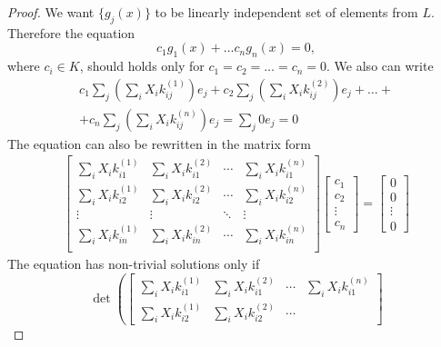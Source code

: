 \begin{theorem}
\begin{proof}
{      We want $\{g_j(x)\}$ to be linearly independent set of elements
      from $L$. Therefore the equation
      \[
      c_1 g_1(x) + \dots c_n g_n(x) = 0,
      \]
      where $c_i \in K$, should holds only for $c_1 = c_2 = \dots =
      c_n = 0$.
      We also can write
      \begin{eqnarray}
      c_1 \sum_j \left(\sum_i X_i k_{ij}^{(1)} \right) e_j  +
      c_2 \sum_j \left(\sum_i X_i k_{ij}^{(2)} \right) e_j  +
      \dots
      +
      \nonumber \\
      +
      c_n \sum_j \left(\sum_i X_i k_{ij}^{(n)} \right) e_j  =
      \sum_j 0 e_j = 0
      \nonumber
      \end{eqnarray}
      The equation can also be rewritten in the matrix form
      \begin{eqnarray}
        \begin{bmatrix}
          \sum_i X_i k_{i1}^{(1)} & \sum_i X_i k_{i1}^{(2)} & \cdots &
          \sum_i X_i k_{i1}^{(n)} \\
          \sum_i X_i k_{i2}^{(1)} & \sum_i X_i k_{i2}^{(2)} & \cdots &
          \sum_i X_i k_{i2}^{(n)} \\
          \vdots & \vdots & \ddots & \vdots \\
          \sum_i X_i k_{in}^{(1)} & \sum_i X_i k_{in}^{(2)} & \cdots &
          \sum_i X_i k_{in}^{(n)} \\
        \end{bmatrix}
        \begin{bmatrix}
          c_1 \\
          c_2 \\
          \vdots \\
          c_n
        \end{bmatrix}
        =      
        \begin{bmatrix}
          0 \\
          0 \\
          \vdots \\
          0
        \end{bmatrix}
        \nonumber
      \end{eqnarray}
      The equation has non-trivial solutions only if
      \begin{equation}
      \det\left(
        \begin{bmatrix}
          \sum_i X_i k_{i1}^{(1)} & \sum_i X_i k_{i1}^{(2)} & \cdots &
          \sum_i X_i k_{i1}^{(n)} \\
          \sum_i X_i k_{i2}^{(1)} & \sum_i X_i k_{i2}^{(2)} & \cdots &

\end{bmatrix}
\end{equation}}
\end{proof}
\end{theorem}
